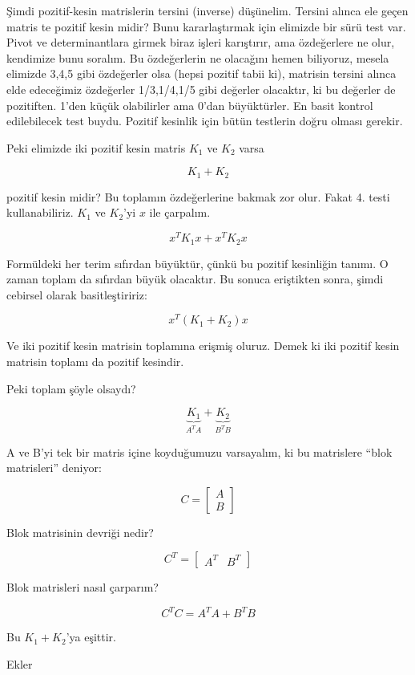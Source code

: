 \documentclass[12pt,fleqn]{article}\usepackage{../../common}
\begin{document}
Şimdi pozitif-kesin matrislerin tersini (inverse) düşünelim. Tersini alınca
ele geçen matris te pozitif kesin midir? Bunu kararlaştırmak için elimizde
bir sürü test var. Pivot ve determinantlara girmek biraz işleri karıştırır,
ama özdeğerlere ne olur, kendimize bunu soralım. Bu özdeğerlerin ne
olacağını hemen biliyoruz, mesela elimizde 3,4,5 gibi özdeğerler olsa
(hepsi pozitif tabii ki), matrisin tersini alınca elde edeceğimiz
özdeğerler 1/3,1/4,1/5 gibi değerler olacaktır, ki bu değerler de
pozitiften. 1'den küçük olabilirler ama 0'dan büyüktürler. En basit kontrol
edilebilecek test buydu. Pozitif kesinlik için bütün testlerin doğru olması
gerekir. 

Peki elimizde iki pozitif kesin matris $K_1$ ve $K_2$ varsa 

$$ K_1 + K_2 $$

pozitif kesin midir? Bu toplamın özdeğerlerine bakmak zor olur. Fakat
4. testi kullanabiliriz. $K_1$ ve $K_2$'yi $x$ ile çarpalım. 

$$ x^TK_1x + x^TK_2x $$

Formüldeki her terim sıfırdan büyüktür, çünkü bu pozitif kesinliğin
tanımı. O zaman toplam da sıfırdan büyük olacaktır. Bu sonuca eriştikten
sonra, şimdi cebirsel olarak basitleştiririz:

$$ x^T(K_1 + K_2)x $$

Ve iki pozitif kesin matrisin toplamına erişmiş oluruz. Demek ki iki
pozitif kesin matrisin toplamı da pozitif kesindir. 

Peki toplam şöyle olsaydı?

$$ \underbrace{K_1}_{A^TA} + \underbrace{K_2}_{B^TB} $$

A ve B'yi tek bir matris içine koyduğumuzu varsayalım, ki bu matrislere
``blok matrisleri'' deniyor:

$$ C = 
\left[\begin{array}{r}
A \\
B
\end{array}\right]
 $$

Blok matrisinin devriği nedir? 

$$ 
C^T = 
\left[\begin{array}{rr}
A^T & B^T
\end{array}\right]
 $$

Blok matrisleri nasıl çarparım?

$$  
C^TC = A^TA + B^TB 
$$  

Bu $K_1 + K_2$'ya eşittir. 

Ekler
\end{document}
